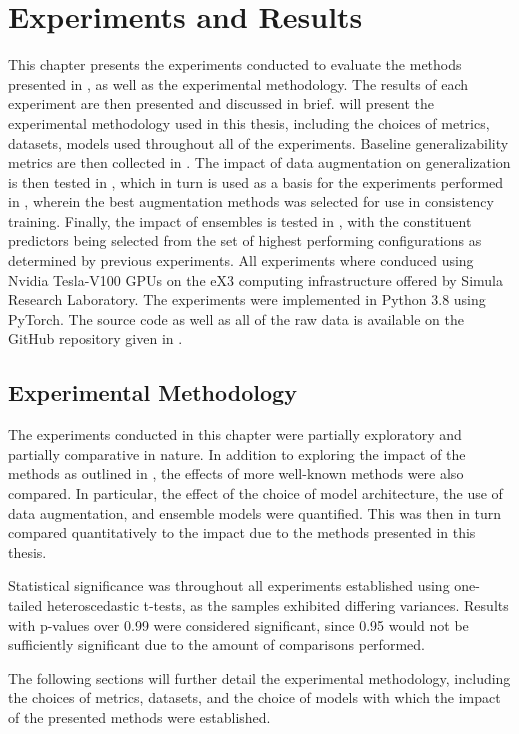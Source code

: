 \chapter{Experiments and Results}\label{experiments}
This chapter presents the experiments conducted to evaluate the methods presented in , as well as the experimental methodology. The results of each experiment are then presented and discussed in brief.  will present the experimental methodology used in this thesis, including the choices of metrics, datasets, models used throughout all of the experiments. Baseline generalizability metrics are then collected in . The impact of data augmentation on generalization is then tested in , which in turn is used as a basis for the experiments performed in , wherein the best augmentation methods was selected for use in consistency training. Finally, the impact of ensembles is tested in , with the constituent predictors being selected from the set of highest performing configurations as determined by previous experiments. All experiments where conduced using Nvidia Tesla-V100 GPUs on the eX3 computing infrastructure offered by Simula Research Laboratory. The experiments were implemented in Python 3.8 using PyTorch. The source code as well as all of the raw data is available on the GitHub repository given in .

\section{Experimental Methodology}\label{exp_meth}
The experiments conducted in this chapter were partially exploratory and partially comparative in nature. In addition to exploring the impact of the methods as outlined in , the effects of more well-known methods were also compared. In particular, the effect of the choice of model architecture, the use of data augmentation, and ensemble models were quantified. This was then in turn compared quantitatively to the impact due to the methods presented in this thesis. 

Statistical significance was throughout all experiments established using one-tailed heteroscedastic t-tests, as the samples exhibited differing variances. Results with p-values over 0.99 were considered significant, since 0.95 would not be sufficiently significant due to the amount of comparisons performed.  

The following sections will further detail the experimental methodology, including the choices of metrics, datasets, and the choice of models with which the impact of the presented methods were established. 

